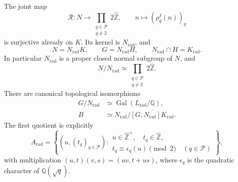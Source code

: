 \begin{theorem}\label{thm:rational-radical-normalization}
The joint map
\[
 \mathcal R:N\longrightarrow
       \prod_{\substack{q\in\mathcal P\\q\ne2}}2\widehat{\mathbb Z},
 \qquad n\longmapsto(\rho_q^I(n))_q
\]
is surjective already on $K$. Its kernel is $N_{\mathrm{rad}}$,
and
\[
 N=N_{\mathrm{rad}}K,\qquad
 G=N_{\mathrm{rad}}H,\qquad
 N_{\mathrm{rad}}\cap H=K_{\mathrm{rad}}.
\]
In particular $N_{\mathrm{rad}}$ is a proper closed normal subgroup
of $N$, and
\[
 N/N_{\mathrm{rad}}\simeq
       \prod_{\substack{q\in\mathcal P\\q\ne2}}2\widehat{\mathbb Z}.
\]
There are canonical topological isomorphisms
\begin{align*}
 G/N_{\mathrm{rad}}&\simeq
            \operatorname{Gal}(L_{\mathrm{rad}}/\mathbb Q),\\
 B&\simeq N_{\mathrm{rad}}/
       \overline{[G,N_{\mathrm{rad}}]K_{\mathrm{rad}}}.
\end{align*}
The first quotient is explicitly
\[
 A_{\mathrm{rad}}=
 \left\{(u,(t_q)_{q\in\mathcal P}):
 \begin{array}{l}
 u\in\widehat{\mathbb Z}^{\times},\quad
 t_q\in\widehat{\mathbb Z},\\
 t_q\equiv\epsilon_q(u)\pmod2\quad(q\in\mathcal P)
 \end{array}\right\},
\]
with multiplication $(u,t)(v,s)=(uv,t+us)$, where
$\epsilon_q$ is the quadratic character of $\mathbb Q(\sqrt q)$.
\end{theorem}

